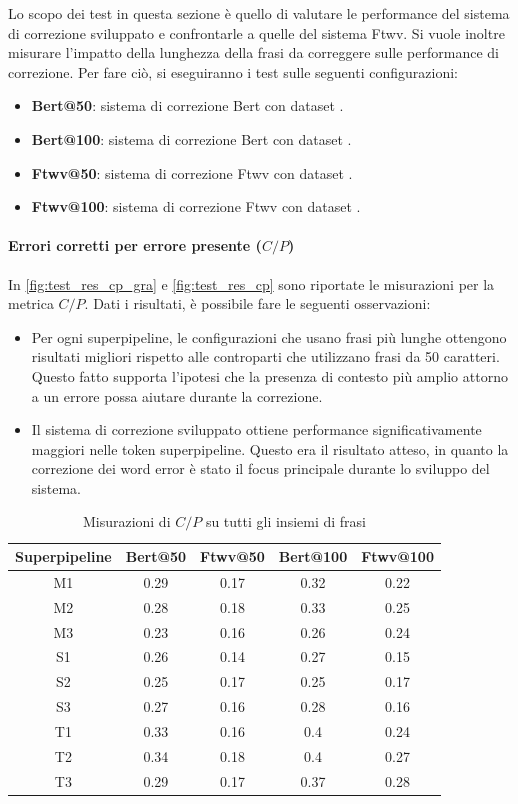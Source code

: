 Lo scopo dei test in questa sezione è quello di valutare le performance del sistema di correzione sviluppato e confrontarle a quelle del sistema Ftwv. Si vuole inoltre misurare l'impatto della lunghezza della frasi da correggere sulle performance di correzione. Per fare ciò, si eseguiranno i test sulle seguenti configurazioni:
\begin{itemize}
\item \textbf{Bert@50}: sistema di correzione Bert con dataset \dsta.
\item \textbf{Bert@100}: sistema di correzione Bert con dataset \dstb.
\item \textbf{Ftwv@50}: sistema di correzione Ftwv con dataset \dsta.
\item \textbf{Ftwv@100}: sistema di correzione Ftwv con dataset \dstb.
\end{itemize}





\paragraph{Errori corretti per errore presente ($C/P$)}
In \autoref{fig:test_res_cp_gra} e \autoref{fig:test_res_cp} sono riportate le misurazioni per la metrica $C/P$. Dati i risultati, è possibile fare le seguenti osservazioni:
\begin{itemize}
\item Per ogni superpipeline, le configurazioni che usano frasi più lunghe ottengono risultati migliori rispetto alle controparti che utilizzano frasi da 50 caratteri. Questo fatto supporta l'ipotesi che la presenza di contesto più amplio attorno a un errore possa aiutare durante la correzione.

\item Il sistema di correzione sviluppato ottiene performance significativamente maggiori nelle token superpipeline. Questo era il risultato atteso, in quanto la correzione dei word error è stato il focus principale durante lo sviluppo del sistema.

\end{itemize}

\begin{table}[H]
\centering
\begin{tabular}{c|cc|cc}
\textbf{Superpipeline} & \textbf{Bert@50} &  \textbf{Ftwv@50} & \textbf{Bert@100} & \textbf{Ftwv@100}\\
\hline
M1& 0.29& 0.17& 0.32& 0.22\\
M2& 0.28& 0.18& 0.33& 0.25\\
M3& 0.23& 0.16& 0.26& 0.24\\
S1& 0.26& 0.14& 0.27& 0.15\\
S2& 0.25& 0.17& 0.25& 0.17\\
S3& 0.27& 0.16& 0.28& 0.16\\
T1& 0.33& 0.16& 0.4& 0.24\\
T2& 0.34& 0.18& 0.4& 0.27\\
T3& 0.29& 0.17& 0.37& 0.28\\
\end{tabular}
\caption{Misurazioni di $C/P$ su tutti gli insiemi di frasi}
\label{fig:test_res_cp_gra}
\end{table}

